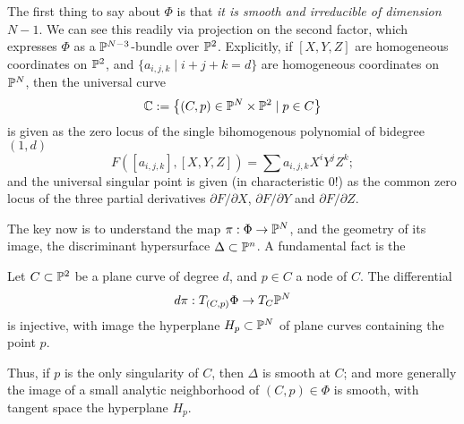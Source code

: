 The first thing to say about $\Phi$ is that \emph{it is smooth and irreducible of dimension $N-1$}. We can see this readily via projection on the second factor, which expresses $\Phi$ as a ${\mathbb P}^{N-3}$-bundle over ${\mathbb P}^2$. Explicitly, if $[X,Y,Z]$ are homogeneous coordinates on ${\mathbb P}^2$, and $\{a_{i,j,k} \mid i+j+k = d \}$ are homogeneous coordinates on ${\mathbb P}^N$, then the universal curve 
$$
{\mathbb C} := \left\{ (C, p) \in {\mathbb P}^N \times {\mathbb P}^2 \mid p \in C \right\}
$$
is given as the zero locus of the single bihomogenous polynomial of bidegree $(1, d)$
$$
F([a_{i,j,k}], [X,Y,Z] ) = \sum a_{i,j,k} X^iY^jZ^k;
$$
and the universal singular point is given (in characteristic 0!) as the common zero locus of the three partial derivatives $\partial F/\partial X$, $\partial F/\partial Y$ and  $\partial F/\partial Z$. 

The key now is to understand the map $\pi : \Phi \to {\mathbb P}^N$, and the geometry of its image, the discriminant hypersurface  $\Delta \subset {\mathbb P}^n$. A fundamental fact is the

\begin{lemma}\label{tangent space to discriminant}
Let $C \subset {\mathbb P}^2$ be a plane curve of degree $d$, and $p \in C$ a node of $C$. The differential 
$$
d\pi : T_{(C,p)}\Phi \to T_C {\mathbb P}^N
$$
is injective, with image the hyperplane $H_p \subset {\mathbb P}^N$ of plane curves containing the point $p$.
\end{lemma}

Thus, if $p$ is the only singularity of $C$, then $\Delta$ is smooth at $C$; and more generally the image of a small analytic neighborhood of $(C,p) \in \Phi$ is smooth, with tangent space the hyperplane $H_p$.

